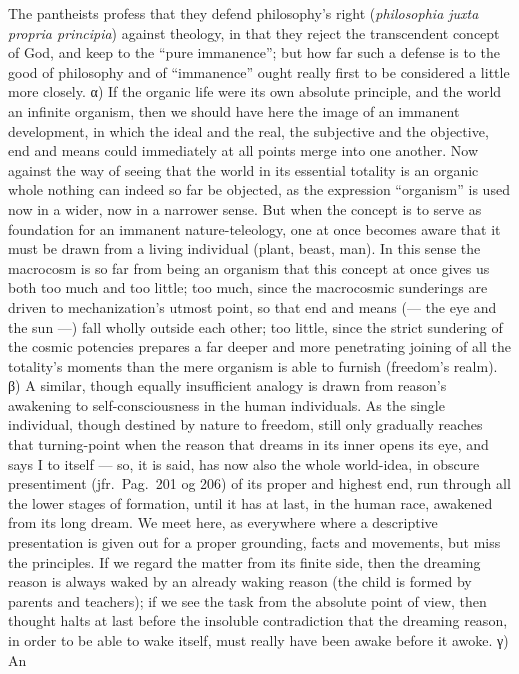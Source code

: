 \documentclass[12pt]{book}
\begin{document}
The pantheists profess that they defend philosophy's right
(\textit{philosophia juxta propria principia}) against theology, in that
they reject the transcendent concept of God, and keep to the ``pure
immanence''; but how far such a defense is to the good of philosophy and of
``immanence'' ought really first to be considered a little more closely.
α) If the organic life were its own absolute principle, and the world an
infinite organism, then we should have here the image of an immanent
development, in which the ideal and the real, the subjective and the
objective, end and means could immediately at all points merge into one
another. Now against the way of seeing that the world in its essential
totality is an organic whole nothing can indeed so far be objected, as the
expression ``organism'' is used now in a wider, now in a narrower sense. But
when the concept is to serve as foundation for an immanent nature-teleology,
one at once becomes aware that it must be drawn from a living individual
(plant, beast, man). In this sense the macrocosm is so far from being an
organism that this concept at once gives us both too much and too little;
too much, since the macrocosmic sunderings are driven to mechanization's
utmost point, so that end and means (--- the eye and the sun ---) fall
wholly outside each other; too little, since the strict sundering of the
cosmic potencies prepares a far deeper and more penetrating joining of all
the totality's moments than the mere organism is able to furnish (freedom's
realm). β) A similar, though equally insufficient analogy is drawn from
reason's awakening to self-consciousness in the human individuals. As the
single individual, though destined by nature to freedom, still only
gradually reaches that turning-point when the reason that dreams in its
inner opens its eye, and says I to itself --- so, it is said, has now also
the whole world-idea, in obscure presentiment (jfr.\ Pag.\ 201 og 206) of
its proper and highest end, run through all the lower stages of formation,
until it has at last, in the human race, awakened from its long dream. We
meet here, as everywhere where a descriptive presentation is given out for a
proper grounding, facts and movements, but miss the principles. If we regard
the matter from its finite side, then the dreaming reason is always waked by
an already waking reason (the child is formed by parents and teachers); if
we see the task from the absolute point of view, then thought halts at last
before the insoluble contradiction that the dreaming reason, in order to be
able to wake itself, must really have been awake before it awoke. γ) An
\end{document}
